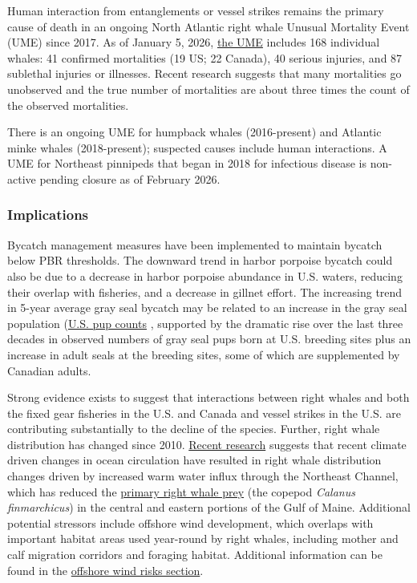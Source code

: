 \documentclass[
  10pt,
]{article}
\begin{document}
Human interaction from entanglements or vessel strikes remains the primary cause of death in an ongoing North Atlantic right whale Unusual Mortality Event (UME) since 2017. As of January 5, 2026, \href{https://www.fisheries.noaa.gov/national/marine-life-distress/2017-2026-north-atlantic-right-whale-unusual-mortality-event}{the UME} includes 168 individual whales: 41 confirmed mortalities (19 US; 22 Canada), 40 serious injuries, and 87 sublethal injuries or illnesses. Recent research suggests that many mortalities go unobserved and the true number of mortalities are about three times the count of the observed mortalities.

There is an ongoing UME for humpback whales (2016-present) and Atlantic minke whales (2018-present); suspected causes include human interactions. A UME for Northeast pinnipeds that began in 2018 for infectious disease is non-active pending closure as of February 2026.

\subsubsection{Implications}\label{implications-4}

Bycatch management measures have been implemented to maintain bycatch below PBR thresholds. The downward trend in harbor porpoise bycatch could also be due to a decrease in harbor porpoise abundance in U.S. waters, reducing their overlap with fisheries, and a decrease in gillnet effort. The increasing trend in 5-year average gray seal bycatch may be related to an increase in the gray seal population (\href{https://noaa-edab.github.io/catalog/seal_pups.html}{U.S. pup counts} , supported by the dramatic rise over the last three decades in observed numbers of gray seal pups born at U.S. breeding sites plus an increase in adult seals at the breeding sites, some of which are supplemented by Canadian adults.

Strong evidence exists to suggest that interactions between right whales and both the fixed gear fisheries in the U.S. and Canada and vessel strikes in the U.S. are contributing substantially to the decline of the species. Further, right whale distribution has changed since 2010. \href{https://noaa-edab.github.io/catalog/narw.html}{Recent research} suggests that recent climate driven changes in ocean circulation have resulted in right whale distribution changes driven by increased warm water influx through the Northeast Channel, which has reduced the \href{https://noaa-edab.github.io/catalog/preyfield_energy.html}{primary right whale prey} (the copepod \emph{Calanus finmarchicus}) in the central and eastern portions of the Gulf of Maine. Additional potential stressors include offshore wind development, which overlaps with important habitat areas used year-round by right whales, including mother and calf migration corridors and foraging habitat. Additional information can be found in the \hyperref[other-ocean-uses-offshore-wind]{offshore wind risks section}.
\end{document}
